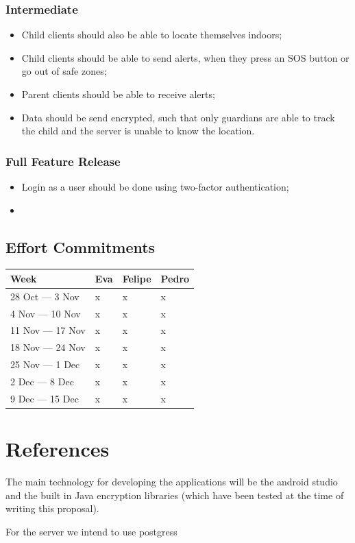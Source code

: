 \documentclass[a4paper]{article}
\begin{document}
\subsubsection{Intermediate}

\begin{itemize}
    \item Child clients should also be able to locate themselves indoors;
    \item Child clients should be able to send alerts, when they press an SOS button or go out of safe zones;
    \item Parent clients should be able to receive alerts;
    \item Data should be send encrypted, such that only guardians are able to track the child and the server is unable to know the location.
\end{itemize}


\subsubsection{Full Feature Release}


\begin{itemize}
    \item Login as a user should be done using two-factor authentication;
    \item
\end{itemize}

\subsection{Effort Commitments}

\begin{tabular}{llll}
    \toprule
    Week & Eva & Felipe & Pedro\\ \toprule
    28 Oct --- 3 Nov & x & x & x\\\midrule
    4 Nov --- 10 Nov & x & x & x\\\midrule
    11 Nov --- 17 Nov & x & x & x\\\midrule
    18 Nov --- 24 Nov & x & x & x\\\midrule
    25 Nov --- 1 Dec & x & x & x\\\midrule
    2 Dec --- 8 Dec & x & x & x\\\midrule
    9 Dec --- 15 Dec & x & x & x\\\bottomrule
\end{tabular}

\section{References}
The main technology for developing the applications will be the android studio and the built in Java
encryption libraries (which have been tested at the time of writing this proposal).

For the server we intend to use postgress
\end{document}
